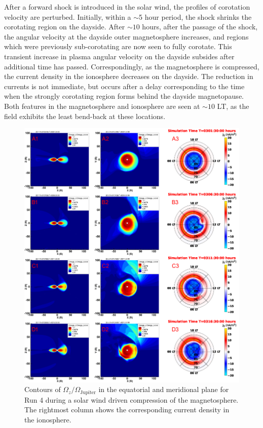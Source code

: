 After a forward shock is introduced in the solar wind, the profiles of corotation velocity are perturbed. Initially, within a $\sim$5 hour period, the shock shrinks the corotating region on the dayside. After $\sim10$ hours, after the passage of the shock, the angular velocity at the dayside outer magnetosphere increases, and regions which were previously sub-corotating are now seen to fully corotate. This transient increase in plasma angular velocity on the dayside subsides after additional time has passed. Correspondingly, as the magnetosphere is compressed, the current density in the ionosphere decreases on the dayside. The reduction in currents is not immediate, but occurs after a delay corresponding to the time when the strongly corotating region forms behind the dayside magnetopause. Both features in the magnetosphere and ionosphere are seen at $\sim10$ LT, as the field exhibits the least bend-back at these locations. 

\begin{figure}
    \centering
    \includegraphics[width=\textwidth]{images3/combined_corotation_change_2.png}
    \caption{Contours of $\Omega_z/\Omega_\text{Jupiter}$ in the equatorial and meridional plane for Run 4 during a solar wind driven compression of the magnetosphere. The rightmost column shows the corresponding current density in the ionosphere.}
    \label{fig:combined-corotation-change-2}
\end{figure}

